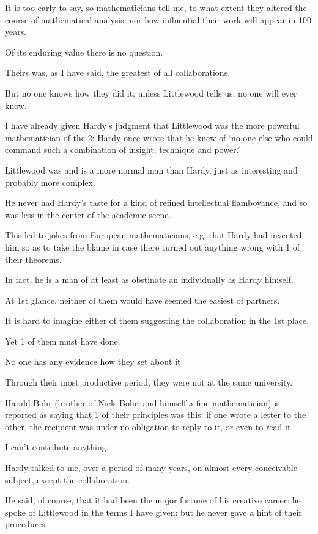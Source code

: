 \documentclass{article}
\numberwithin{equation}{section}
\begin{document}
It is too early to say, so mathematicians tell me, to what extent they altered the course of mathematical analysis: nor how influential their work will appear in 100 years.

Of its enduring value there is no question.

%
Theirs was, as I have said, the greatest of all collaborations.

But no one knows how they did it: unless Littlewood tells us, no one will ever know.

I have already given Hardy's judgment that Littlewood was the more powerful mathematician of the 2: Hardy once wrote that he knew of `no one else who could command such a combination of insight, technique and power.'

Littlewood was and is a more normal man than Hardy, just as interesting and probably more complex.

He never had Hardy's taste for a kind of refined intellectual flamboyance, and so was less in the center of the academic scene.

This led to jokes from European mathematicians, e.g. that Hardy had invented him so as to take the blame in case there turned out anything wrong with 1 of their theorems.

In fact, he is a man of at least as obstinate an individually as Hardy himself.

%
At 1st glance, neither of them would have seemed the easiest of partners.

It is hard to imagine either of them suggesting the collaboration in the 1st place.

Yet 1 of them must have done.

No one has any evidence how they set about it.

Through their most productive period, they were not at the same university.

Harald Bohr (brother of Niels Bohr, and himself a fine mathematician) is reported as saying that 1 of their principles was this: if one wrote a letter to the other, the recipient was under no obligation to reply to it, or even to read it.

%
I can't contribute anything.

Hardy talked to me, over a period of many years, on almost every conceivable subject, except the collaboration.

He said, of course, that it had been the major fortune of his creative career: he spoke of Littlewood in the terms I have given: but he never gave a hint of their procedures.
\end{document}
